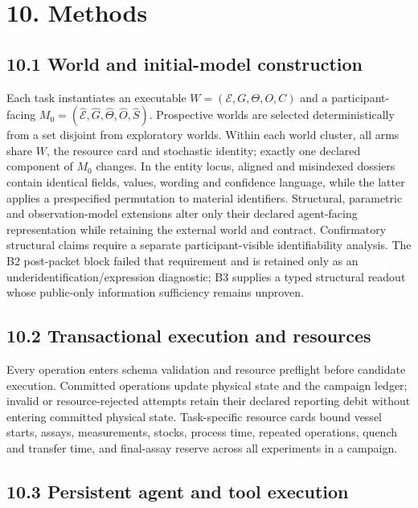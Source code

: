 \documentclass[10pt,twocolumn]{article}
\begin{document}
\section{10. Methods}\label{methods}

\subsection{10.1 World and initial-model
construction}\label{world-and-initial-model-construction}

Each task instantiates an executable \(W=(\mathcal{E},G,\Theta,O,C)\)
and a participant-facing
\(M_0=(\widehat{\mathcal{E}},\widehat{G},\widehat{\Theta},\widehat{O},\widehat{S})\).
Prospective worlds are selected deterministically from a set disjoint
from exploratory worlds. Within each world cluster, all arms share
\(W\), the resource card and stochastic identity; exactly one declared
component of \(M_0\) changes. In the entity locus, aligned and
misindexed dossiers contain identical fields, values, wording and
confidence language, while the latter applies a prespecified permutation
to material identifiers. Structural, parametric and observation-model
extensions alter only their declared agent-facing representation while
retaining the external world and contract. Confirmatory structural
claims require a separate participant-visible identifiability analysis.
The B2 post-packet block failed that requirement and is retained only as
an underidentification/expression diagnostic; B3 supplies a typed
structural readout whose public-only information sufficiency remains
unproven.

\subsection{10.2 Transactional execution and
resources}\label{transactional-execution-and-resources}

Every operation enters schema validation and resource preflight before
candidate execution. Committed operations update physical state and the
campaign ledger; invalid or resource-rejected attempts retain their
declared reporting debit without entering committed physical state.
Task-specific resource cards bound vessel starts, assays, measurements,
stocks, process time, repeated operations, quench and transfer time, and
final-assay reserve across all experiments in a campaign.

\subsection{10.3 Persistent agent and tool
execution}\label{persistent-agent-and-tool-execution}
\end{document}
